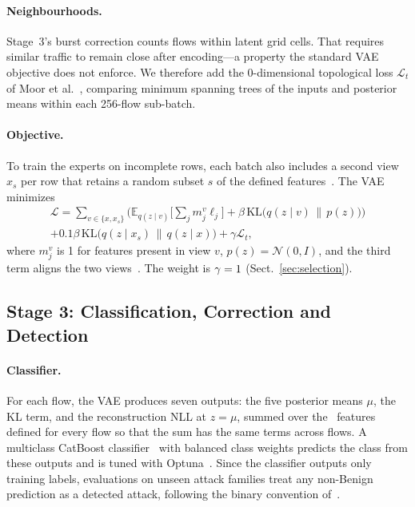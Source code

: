 \documentclass[runningheads,a4paper]{llncs}
\begin{document}
\paragraph{Neighbourhoods.}
Stage~3's burst correction counts flows within latent grid cells. That requires similar traffic to remain close after encoding---a property the standard VAE objective does not enforce. We therefore add the 0-dimensional topological loss $\mathcal{L}_t$ of Moor et al.~\cite{moor2020}, comparing minimum spanning trees of the inputs and posterior means within each 256-flow sub-batch.

\paragraph{Objective.}
To train the experts on incomplete rows, each batch also includes a second view $x_s$ per row that retains a random subset $s$ of the defined features~\cite{ma2019eddi,ivanov2019}. The VAE minimizes
\begin{multline}
\mathcal{L}=\sum_{v\in\{x,x_s\}}\Big(\mathbb{E}_{q(z\mid v)}\big[\textstyle\sum_j m^{v}_j\ell_j\big]+\beta\,\mathrm{KL}\big(q(z\mid v)\,\|\,p(z)\big)\Big)\\
+0.1\beta\,\mathrm{KL}\big(q(z\mid x_s)\,\|\,q(z\mid x)\big)+\gamma\mathcal{L}_t,
\end{multline}
where $m^v_j$ is 1 for features present in view $v$, $p(z)=\mathcal{N}(0,I)$, and the third term aligns the two views~\cite{sinha2021}. The weight is $\gamma=1$ (Sect.~\ref{sec:selection}).

\subsection{Stage 3: Classification, Correction and Detection}

\paragraph{Classifier.}
For each flow, the VAE produces seven outputs: the five posterior means $\mu$, the KL term, and the reconstruction NLL at $z=\mu$, summed over the \AlwaysDefinedCount\ features defined for every flow so that the sum has the same terms across flows. A multiclass CatBoost classifier~\cite{prokhorenkova2018} with balanced class weights predicts the class from these outputs and is tuned with Optuna~\cite{akiba2019}. Since the classifier outputs only training labels, evaluations on unseen attack families treat any non-Benign prediction as a detected attack, following the binary convention of~\cite{ferreira2020}.
\end{document}
